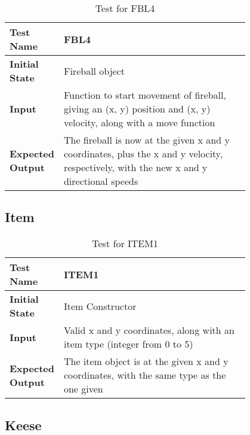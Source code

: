 \documentclass[12pt, titlepage]{article}
\begin{document}
\begin{table}[!htbp]
	
	\begin{tabular}[r]{|l|p{0.8\linewidth}|}
		
		\hline
		
		\textbf{Test Name} & FBL4 \\ 
		\hline
		\textbf{Initial State} & Fireball object \\ 
	\hline
	\textbf{Input} & Function to start movement of fireball, giving an (x, y) position and (x, y) velocity, along with a move function \\ 
	\hline 
	\textbf{Expected Output} & The fireball is now at the given x and y coordinates, plus the x and y velocity, respectively, with the new x and y directional speeds  \\ 
		\hline
		
	\end{tabular}
	\caption{Test for FBL4}
	\label{Table}
\end{table}

\newpage

\subsection{Item}

\begin{table}[!htbp]
	
	\begin{tabular}[r]{|l|p{0.8\linewidth}|}
		
		\hline
		
		\textbf{Test Name} & ITEM1 \\ 
		\hline
		\textbf{Initial State} & Item Constructor \\ 
		\hline
		\textbf{Input} & Valid x and y coordinates, along with an item type (integer from 0 to 5) \\ 
		\hline 
		\textbf{Expected Output} & The item object is at the given x and y coordinates, with the same type as the one given  \\ 
		\hline
		
	\end{tabular}
	\caption{Test for ITEM1}
	\label{Table}
\end{table}

\subsection{Keese}
\end{document}
